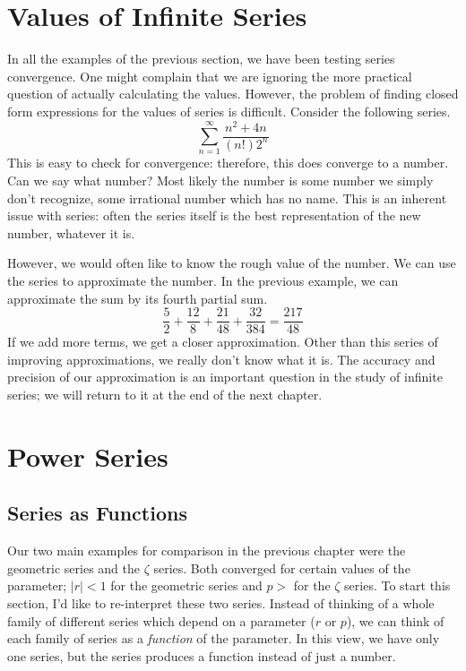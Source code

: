 \documentclass[fleqn]{report}
\begin{document}
\section{Values of Infinite Series}
\label{values-of-series}

In all the examples of the previous section, we have been
testing series convergence. One might complain that we are
ignoring the more practical question of actually calculating
the values. However, the problem of finding closed form
expressions for the values of series is difficult. Consider
the following series.
\begin{equation*}
\sum_{n=1}^\infty \frac{n^2+4n}{(n!)2^n}
\end{equation*}
This is easy to check for convergence: therefore, this does
converge to a number. Can we say what number? Most likely the
number is some number we simply don't recognize, some
irrational number which has no name. This is an inherent
issue with series: often the series itself is the best
representation of the new number, whatever it is.

However, we would often like to know the rough value of the
number. We can use the series to approximate the number. In
the previous example, we can approximate the sum by its fourth
partial sum.
\begin{equation*}
\frac{5}{2} + \frac{12}{8} + \frac{21}{48} + \frac{32}{384} =
\frac{217}{48}
\end{equation*}
If we add more terms, we get a closer approximation.
Other than this series of improving approximations, we really
don't know what it is. The accuracy and precision of our
approximation is an important question in the study of
infinite series; we will return to it at the end of the next
chapter.

\section{Power Series}
\label{power-series}

\subsection{Series as Functions}
\label{series-as-functions}

Our two main examples for comparison in the previous chapter
were the geometric series and the $\zeta$ series. Both
converged for certain values of the parameter; $|r|<1$ for the
geometric series and $p > $ for the $\zeta$ series. To start
this section, I'd like to re-interpret these two series.
Instead of thinking of a whole family of different series
which depend on a parameter ($r$ or $p$), we can think of each
family of series as a \emph{function} of the parameter. In
this view, we have only one series, but the series produces a
function instead of just a number.
\end{document}

